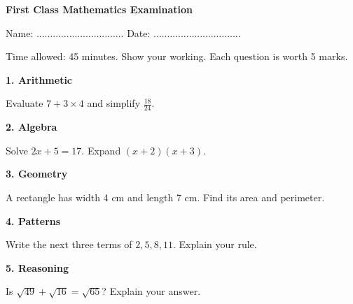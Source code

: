 \textbf{First Class Mathematics Examination}\par
Name: ................................ Date: ................................\par
Time allowed: 45 minutes. Show your working. Each question is worth 5 marks.\par
\textbf{1. Arithmetic}\par
Evaluate $7+3\times4$ and simplify $\frac{18}{24}$.\par
\textbf{2. Algebra}\par
Solve $2x+5=17$. Expand $(x+2)(x+3)$.\par
\textbf{3. Geometry}\par
A rectangle has width 4 cm and length 7 cm. Find its area and perimeter.\par
\textbf{4. Patterns}\par
Write the next three terms of $2,5,8,11$. Explain your rule.\par
\textbf{5. Reasoning}\par
Is $\sqrt{49}+\sqrt{16}=\sqrt{65}$? Explain your answer.\par
\bye
